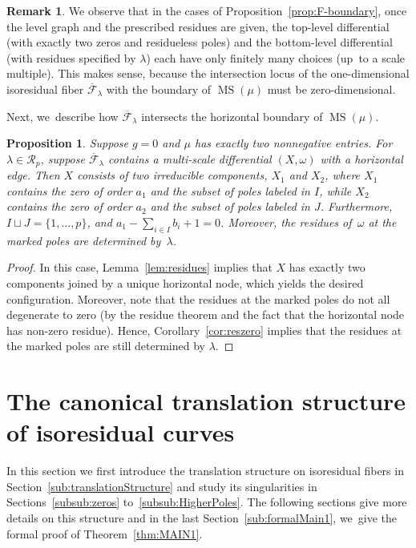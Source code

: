 \documentclass[JEP,XML,SOM,Unicode,NoFloatCountersInSection,published]{cedram}
\DeclareMathOperator\MS{MS}
\newtheorem{prop}[thm]{Proposition}
\theoremstyle{definition}
\newtheorem{rmk}[thm]{Remark}
\begin{document}
\begin{rmk}
We observe that in the cases of Proposition~\ref{prop:F-boundary}, once the level graph and the prescribed residues are given, the top-level differential (with exactly two zeros and residueless poles) and the bottom-level differential (with residues specified by $\lambda$) each have only finitely many choices (up~to a scale multiple). This makes sense, because the intersection locus of the one-dimensional isoresidual fiber $\overline{\mathcal F}_\lambda$ with the boundary of $\MS(\mu)$ must be zero-dimensional.
\end{rmk}

Next, we~describe how $\overline{\mathcal F}_\lambda$ intersects the horizontal boundary of $\MS(\mu)$.

\begin{prop}\label{prop:F-horizontal}
Suppose $g=0$ and $\mu$ has exactly two nonnegative entries.
For $\lambda \in \mathcal{R}_{p}$,
suppose $\overline{\mathcal F}_\lambda$ contains a multi-scale differential $(X,\omega)$ with a horizontal edge. Then $X$ consists of two irreducible components, $X_1$ and $X_2$, where $X_1$ contains the zero of order $a_1$ and the subset of poles labeled in $I$, while $X_2$ contains the zero of order $a_2$ and the subset of poles labeled in $J$. Furthermore, $I\sqcup J = \{1,\ldots,p\}$, and $a_1 - \sum_{i \in I} b_i + 1 = 0$. Moreover, the residues of~$\omega$ at the marked poles are determined by~$\lambda$.
\end{prop}

\begin{proof}
In this case, Lemma~\ref{lem:residues} implies that $X$ has exactly two components joined by a unique horizontal node, which yields the desired configuration. Moreover, note that the residues at the marked poles do not all degenerate to zero (by the residue theorem and the fact that the horizontal node has non-zero residue). Hence, Corollary~\ref{cor:reszero} implies that the residues at the marked poles are still determined by $\lambda$.
\end{proof}

\section{The canonical translation structure of isoresidual curves}\label{sec:Translation}

In this section we first introduce the translation structure on isoresidual fibers in Section~\ref{sub:translationStructure} and study its singularities in Sections~\ref{subsub:zeros} to~\ref{subsub:HigherPoles}. The following sections give more details on this structure and in the last Section~\ref{sub:formalMain1}, we~give the formal proof of Theorem~\ref{thm:MAIN1}.
\end{document}
